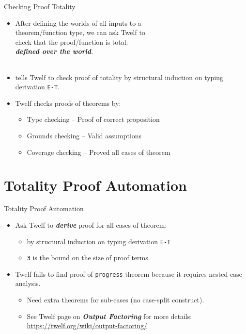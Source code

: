 \documentclass{beamer}
\renewcommand{\emph}[1]{\textbf{\textit{#1}}}
\begin{document}
\begin{frame}{Checking Proof Totality}
\begin{itemize}
\item After defining the worlds of all inputs to a \\
theorem/function type, we can ask Twelf to \\
check that the proof/function is total:  \\
\emph{defined over the world}. \\

\linespace
\texttt{} \\
\texttt{}
\linespace

\item \texttt{} tells Twelf to check
proof of totality by structural induction on typing derivation
\texttt{E-T}.

\pause
\item Twelf checks proofs of theorems by:
	\begin{itemize}
	\item Type checking -- Proof of correct proposition
	\item Grounds checking -- Valid assumptions
	\item Coverage checking -- Proved all cases of theorem
	\end{itemize}
\end{itemize}
\end{frame}

\section{Totality Proof Automation}

\begin{frame}{Totality Proof Automation}
\begin{itemize}
\item
Ask Twelf to \emph{derive} proof for all cases of theorem: \\
\texttt{}
	\begin{itemize}
	\item by structural induction on typing derivation \texttt{E-T}
	\item \texttt{3} is the bound on the size of proof terms.
	\end{itemize}

\pause
\item
Twelf fails to find proof of \texttt{progress} theorem because it
requires nested case analysis.
	\begin{itemize}
	\item Need extra theorems for sub-cases (no case-split construct).
	\item See Twelf page on \emph{Output Factoring} for more details: \\
	\url{https://twelf.org/wiki/output-factoring/}
	\end{itemize}
\end{itemize}
\end{frame}
\end{document}
